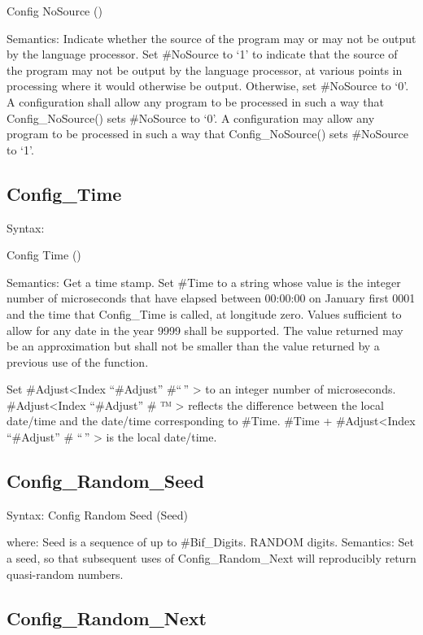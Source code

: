 Config NoSource ()

Semantics: Indicate whether the source of the program may or may not be
output by the language processor. Set \#NoSource to `1' to indicate that
the source of the program may not be output by the language processor,
at various points in processing where it would otherwise be output.
Otherwise, set \#NoSource to `0'. A configuration shall allow any
program to be processed in such a way that Config\_NoSource() sets
\#NoSource to `0'. A configuration may allow any program to be processed
in such a way that Config\_NoSource() sets \#NoSource to `1'.

\hypertarget{config_time}{%
\subsection{Config\_Time}\label{config_time}}

Syntax:

Config Time ()

Semantics: Get a time stamp. Set \#Time to a string whose value is the
integer number of microseconds that have elapsed between 00:00:00 on
January first 0001 and the time that Config\_Time is called, at
longitude zero. Values sufficient to allow for any date in the year 9999
shall be supported. The value returned may be an approximation but shall
not be smaller than the value returned by a previous use of the
function.

Set \#Adjust\textless Index ``\#Adjust'' \#``\,'' \textgreater{} to an
integer number of microseconds. \#Adjust\textless Index ``\#Adjust'' \#
™ \textgreater{} reflects the difference between the local date/time and
the date/time corresponding to \#Time. \#Time + \#Adjust\textless Index
``\#Adjust'' \# ``\,'' \textgreater{} is the local date/time.

\hypertarget{config_random_seed}{%
\subsection{Config\_Random\_Seed}\label{config_random_seed}}

Syntax: Config Random Seed (Seed)

where: Seed is a sequence of up to \#Bif\_Digits. RANDOM digits.
Semantics: Set a seed, so that subsequent uses of Config\_Random\_Next
will reproducibly return quasi-random numbers.

\hypertarget{config_random_next}{%
\subsection{Config\_Random\_Next}\label{config_random_next}}

